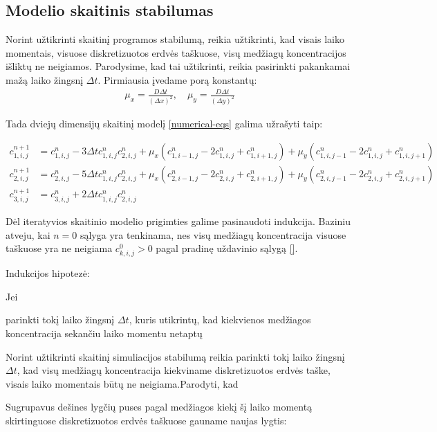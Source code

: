 \subsection{Modelio skaitinis stabilumas}

Norint užtikrinti skaitinį programos stabilumą, reikia užtikrinti, kad visais laiko momentais, visuose diskretizuotos erdvės taškuose, visų medžiagų koncentracijos išliktų ne neigiamos. Parodysime, kad tai užtikrinti, reikia pasirinkti pakankamai mažą laiko žingsnį $\Delta t$. Pirmiausia įvedame porą konstantų: 
\begin{align*}
\mu_x = \frac{D\Delta t}{(\Delta x)^2}, \quad
\mu_y = \frac{D\Delta t}{(\Delta y)^2}
\end{align*}

Tada dviejų dimensijų skaitinį modelį \eqref{numerical-eqs} galima užrašyti taip:

\begin{subequations}
    \begin{align}
    c^{n+1}_{1,i,j}&=c^n_{1,i,j}-3\Delta tc^{n}_{1,i,j} c^{n}_{2,i,j}+\mu_x(c^n_{1,i-1,j}-2c^n_{1,i,j}+c^n_{1,i+1,j})+\mu_y(c^n_{1,i,j-1}-2c^n_{1,i,j}+c^n_{1,i,j+1})\\
    c^{n+1}_{2,i,j}&=c^n_{2,i,j}-5\Delta tc^{n}_{1,i,j} c^{n}_{2,i,j}+\mu_x(c^n_{2,i-1,j}-2c^n_{2,i,j}+c^n_{2,i+1,j})+\mu_y(c^n_{2,i,j-1}-2c^n_{2,i,j}+c^n_{2,i,j+1})\\
    c^{n+1}_{3,i,j}&=c^n_{3,i,j}+2\Delta tc^{n}_{1,i,j}c^{n}_{2,i,j}
    \end{align}
\end{subequations}

Dėl iteratyvios skaitinio modelio prigimties galime pasinaudoti indukcija. Baziniu atveju, kai $n=0$ sąlyga yra tenkinama, nes visų medžiagų koncentracija visuose taškuose yra ne neigiama $c^0_{k, i,j}>0$ pagal pradinę uždavinio sąlygą \eqref{}.

Indukcijos hipotezė:

Jei 

parinkti tokį laiko žingsnį $\Delta t$, kuris utikrintų, kad kiekvienos medžiagos koncentracija sekančiu laiko momentu netaptų

Norint užtikrinti skaitinį simuliacijos stabilumą reikia parinkti tokį laiko žingsnį $\Delta t$, kad visų medžiagų koncentracija kiekviname diskretizuotos erdvės taške, visais laiko momentais būtų ne neigiama.Parodyti, kad 



Sugrupavus dešines lygčių puses pagal medžiagos kiekį šį laiko momentą skirtinguose diskretizuotos erdvės taškuose gauname naujas lygtis:


